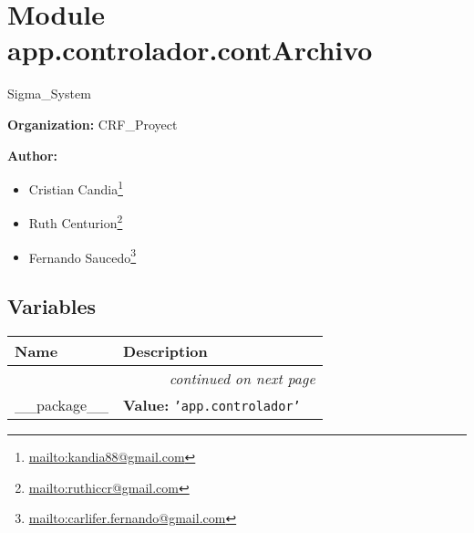 %
%
%


\section{Module app.controlador.contArchivo}

    \label{app:controlador:contArchivo}
Sigma\_System

\textbf{Organization:} CRF\_Proyect



\textbf{Author:} \begin{itemize}
\setlength{\parskip}{0.6ex}
  \item Cristian 
    Candia\footnote{\href{mailto:kandia88@gmail.com}{mailto:kandia88@gmail.com}}

  \item Ruth 
    Centurion\footnote{\href{mailto:ruthiccr@gmail.com}{mailto:ruthiccr@gmail.com}}

  \item Fernando 
    Saucedo\footnote{\href{mailto:carlifer.fernando@gmail.com}{mailto:carlifer.fernando@gmail.com}}

\end{itemize}





  \subsection{Variables}

    \vspace{-1cm}
\hspace{\varindent}\begin{longtable}{|p{\varnamewidth}|p{\vardescrwidth}|l}
\cline{1-2}
\cline{1-2} \centering \textbf{Name} & \centering \textbf{Description}& \\
\cline{1-2}
\endhead\cline{1-2}\multicolumn{3}{r}{\small\textit{continued on next page}}\\\endfoot\cline{1-2}
\endlastfoot\raggedright \_\-\_\-p\-a\-c\-k\-a\-g\-e\-\_\-\_\- & \raggedright \textbf{Value:} 
{\tt \texttt{'}\texttt{app.controlador}\texttt{'}}&\\
\cline{1-2}
\end{longtable}


